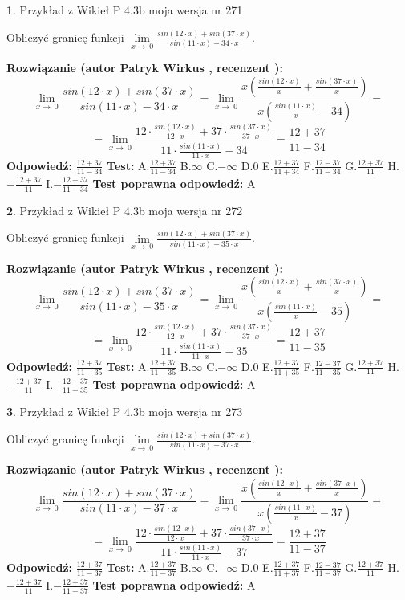 \documentclass[12pt, a4paper]{article}
\theoremstyle{definition} %
\newtheorem{zad}{}
\newcommand{\zadStart}[1]{\begin{zad}#1\newline}
\newcommand{\zadStop}{\end{zad}}
\newcommand{\rozwStart}[2]{\noindent \textbf{Rozwiązanie (autor #1 , recenzent #2): }\newline}
\newcommand{\rozwStop}{\newline}
\newcommand{\odpStart}{\noindent \textbf{Odpowiedź:}\newline}
\newcommand{\odpStop}{\newline}
\newcommand{\testStart}{\noindent \textbf{Test:}\newline}
\newcommand{\testStop}{\newline}
\newcommand{\kluczStart}{\noindent \textbf{Test poprawna odpowiedź:}\newline}
\newcommand{\kluczStop}{\newline}
\begin{document}
\zadStart{Przykład z Wikieł P 4.3b moja wersja nr 271}


Obliczyć granicę funkcji $\lim\limits_{x\to\ 0}\frac{sin(12 \cdot x)+sin(37 \cdot x)}{sin(11 \cdot x)-34 \cdot x}$.
\zadStop
\rozwStart{Patryk Wirkus}{}
$$\lim\limits_{x\to\ 0}\frac{sin(12 \cdot x)+sin(37 \cdot x)}{sin(11 \cdot x)-34 \cdot x}=\lim\limits_{x\to\ 0}\frac{x(\frac{sin(12 \cdot x)}{x}+\frac{sin(37 \cdot x)}{x})}{x(\frac{sin(11 \cdot x)}{x}-34)}=$$
$$=\lim\limits_{x\to\ 0}\frac{12 \cdot \frac{sin(12 \cdot x)}{12 \cdot x}+37 \cdot \frac{sin(37 \cdot x)}{37 \cdot x}}{11 \cdot \frac{sin(11 \cdot x)}{11 \cdot x}-34}=\frac{12+37}{11-34}$$
\rozwStop
\odpStart
$\frac{12+37}{11-34}$
\odpStop
\testStart
A.$\frac{12+37}{11-34}$
B.$\infty$
C.$-\infty$
D.$0$
E.$\frac{12+37}{11+34}$
F.$\frac{12-37}{11-34}$
G.$\frac{12+37}{11}$
H.$-\frac{12+37}{11}$
I.$-\frac{12+37}{11-34}$
\testStop
\kluczStart
A
\kluczStop



\zadStart{Przykład z Wikieł P 4.3b moja wersja nr 272}


Obliczyć granicę funkcji $\lim\limits_{x\to\ 0}\frac{sin(12 \cdot x)+sin(37 \cdot x)}{sin(11 \cdot x)-35 \cdot x}$.
\zadStop
\rozwStart{Patryk Wirkus}{}
$$\lim\limits_{x\to\ 0}\frac{sin(12 \cdot x)+sin(37 \cdot x)}{sin(11 \cdot x)-35 \cdot x}=\lim\limits_{x\to\ 0}\frac{x(\frac{sin(12 \cdot x)}{x}+\frac{sin(37 \cdot x)}{x})}{x(\frac{sin(11 \cdot x)}{x}-35)}=$$
$$=\lim\limits_{x\to\ 0}\frac{12 \cdot \frac{sin(12 \cdot x)}{12 \cdot x}+37 \cdot \frac{sin(37 \cdot x)}{37 \cdot x}}{11 \cdot \frac{sin(11 \cdot x)}{11 \cdot x}-35}=\frac{12+37}{11-35}$$
\rozwStop
\odpStart
$\frac{12+37}{11-35}$
\odpStop
\testStart
A.$\frac{12+37}{11-35}$
B.$\infty$
C.$-\infty$
D.$0$
E.$\frac{12+37}{11+35}$
F.$\frac{12-37}{11-35}$
G.$\frac{12+37}{11}$
H.$-\frac{12+37}{11}$
I.$-\frac{12+37}{11-35}$
\testStop
\kluczStart
A
\kluczStop



\zadStart{Przykład z Wikieł P 4.3b moja wersja nr 273}


Obliczyć granicę funkcji $\lim\limits_{x\to\ 0}\frac{sin(12 \cdot x)+sin(37 \cdot x)}{sin(11 \cdot x)-37 \cdot x}$.
\zadStop
\rozwStart{Patryk Wirkus}{}
$$\lim\limits_{x\to\ 0}\frac{sin(12 \cdot x)+sin(37 \cdot x)}{sin(11 \cdot x)-37 \cdot x}=\lim\limits_{x\to\ 0}\frac{x(\frac{sin(12 \cdot x)}{x}+\frac{sin(37 \cdot x)}{x})}{x(\frac{sin(11 \cdot x)}{x}-37)}=$$
$$=\lim\limits_{x\to\ 0}\frac{12 \cdot \frac{sin(12 \cdot x)}{12 \cdot x}+37 \cdot \frac{sin(37 \cdot x)}{37 \cdot x}}{11 \cdot \frac{sin(11 \cdot x)}{11 \cdot x}-37}=\frac{12+37}{11-37}$$
\rozwStop
\odpStart
$\frac{12+37}{11-37}$
\odpStop
\testStart
A.$\frac{12+37}{11-37}$
B.$\infty$
C.$-\infty$
D.$0$
E.$\frac{12+37}{11+37}$
F.$\frac{12-37}{11-37}$
G.$\frac{12+37}{11}$
H.$-\frac{12+37}{11}$
I.$-\frac{12+37}{11-37}$
\testStop
\kluczStart
A
\kluczStop
\end{document}
